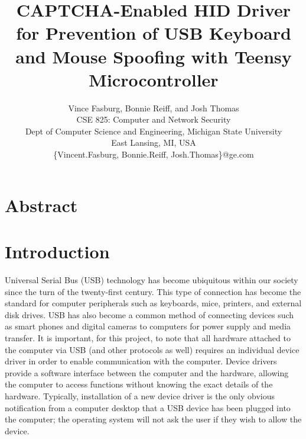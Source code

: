\documentclass[pagenumbers]{ieee}
\begin{document}
\title{CAPTCHA-Enabled HID Driver for Prevention of USB Keyboard and Mouse Spoofing with Teensy Microcontroller\\}

\author{Vince Fasburg, Bonnie Reiff, and Josh Thomas\\
CSE 825: Computer and Network Security\\
Dept of Computer Science and Engineering, Michigan State University\\
East Lansing, MI, USA\\
\{Vincent.Fasburg, Bonnie.Reiff, Josh.Thomas\}@ge.com\\
}

\maketitle
\thispagestyle{empty}


\section{Abstract}
\label{section:abstract}


\section{Introduction}
\label{section:intro}

Universal Serial Bus (USB) technology has become ubiquitous within our society since the turn of the twenty-first century. This type of connection has become the standard for computer peripherals such as keyboards, mice, printers, and external disk drives. USB has also become a common method of connecting devices such as smart phones and digital cameras to computers for power supply and media transfer. It is important, for this project, to note that all hardware attached to the computer via USB (and other protocols as well) requires an individual device driver in order to enable communication with the computer. Device drivers provide a software interface between the computer and the hardware, allowing the computer to access functions without knowing the exact details of the hardware. Typically, installation of a new device driver is the only obvious notification from a computer desktop that a USB device has been plugged into the computer; the operating system will not ask the user if they wish to allow the device.
\end{document}
